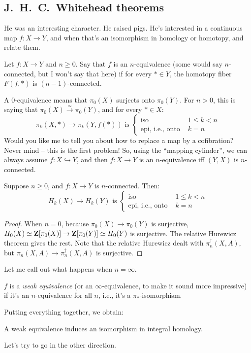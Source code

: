 \subsection{J.~H.~C.~Whitehead theorems}
He was an interesting character. He raised pigs. He's interested in a continuous map $f:X\to Y$, and when that's an isomorphism in homology or homotopy, and relate them.
\begin{definition}
    Let $f:X\to Y$ and $n\geq 0$. Say that $f$ is an $n$-equivalence (some would say $n$-connected, but I won't say that here) if for every $\ast\in Y$, the homotopy fiber $F(f,\ast)$ is $(n-1)$-connected.
\end{definition}
A $0$-equivalence means that $\pi_0(X)$ surjects onto $\pi_0(Y)$. For $n>0$, this is saying that $\pi_0(X)\xrightarrow{\simeq}\pi_0(Y)$, and for every $\ast\in X$:
\begin{equation*}
    \pi_k(X,\ast)\to\pi_k(Y,f(\ast)) \text{ is }\begin{cases}
	\text{iso } & 1\leq k<n\\
	\text{epi, i.e., onto } & k = n
    \end{cases}
\end{equation*}
Would you like me to tell you about how to replace a map by a cofibration? Never mind -- this is the first problem! So, using the ``mapping cylinder'', we can always assume $f:X\hookrightarrow Y$, and then $f:X\to Y$ is an $n$-equivalence iff $(Y,X)$ is $n$-connected.
\begin{theorem}[J.~H.~C.~Whitehead 1]
    Suppose $n\geq 0$, and $f:X\to Y$ is $n$-connected. Then:
\begin{equation*}
H_k(X)\to H_k(Y) \text{ is }\begin{cases}
\text{iso } & 1\leq k<n\\
\text{epi, i.e., onto } & k = n
\end{cases}
\end{equation*}
\end{theorem}
\begin{proof}
    When $n=0$, because $\pi_0(X)\to \pi_0(Y)$ is surjective, $H_0(X)\simeq \mathbf Z[\pi_0(X)]\to \mathbf Z[\pi_0(Y)]\simeq H_0(Y)$ is surjective. The relative Hurewicz theorem gives the rest. Note that the relative Hurewicz dealt with $\pi_n^\dagger(X,A)$, but $\pi_n(X,A)\to\pi_n^\dagger(X,A)$ is surjective.
\end{proof}
Let me call out what happens when $n=\infty$.
\begin{definition}
    $f$ is a \emph{weak equivalence} (or an $\infty$-equivalence, to make it sound more impressive) if it's an $n$-equivalence for all $n$, i.e., it's a $\pi_\ast$-isomorphism.
\end{definition}
Putting everything together, we obtain:
\begin{corollary}
    A weak equivalence induces an isomorphism in integral homology.
\end{corollary}
Let's try to go in the other direction.


